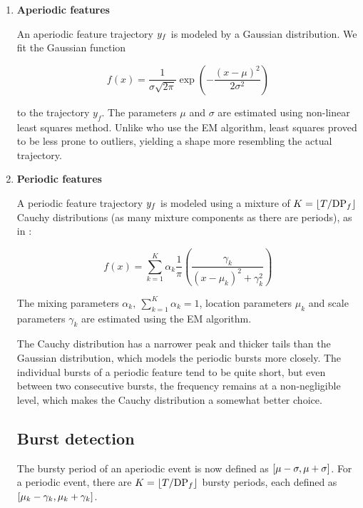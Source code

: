 \begin{enumerate}

\item \textbf{Aperiodic features}

An aperiodic feature trajectory $y_{f}$ is modeled by a Gaussian distribution. We fit the Gaussian function

\begin{equation*}
	f(x) = \frac{1}{\sigma \sqrt{2 \pi}} \exp(-\frac{\left( x - \mu \right)^{2}}{2 \sigma^{2}})
\end{equation*}

to the trajectory $y_{f}$. The parameters $\mu$ and $\sigma$ are estimated using non-linear least squares method. Unlike \cite{event-detection} who use the EM algorithm, least squares proved to be less prone to outliers, yielding a shape more resembling the actual trajectory.

\item \textbf{Periodic features}

A periodic feature trajectory $y_{f}$ is modeled using a mixture of $K = \lfloor T / \text{DP}_{f}\rfloor$ Cauchy distributions (as many mixture components as there are periods), as in \cite{health-events}:

\begin{equation*}
	f(x) = \sum_{k = 1}^{K}{\alpha_{k} \frac{1}{\pi} \left( \frac{\gamma_{k}}{\left( x - \mu_{k} \right)^{2} + \gamma_{k}^{2}} \right)}
\end{equation*}

The mixing parameters $\alpha_{k},\ \sum_{k = 1}^{K}{\alpha_{k}} = 1$, location parameters $\mu_{k}$ and scale parameters $\gamma_{k}$ are estimated using the EM algorithm.

The Cauchy distribution has a narrower peak and thicker tails than the Gaussian distribution, which models the periodic bursts more closely. The individual bursts of a periodic feature tend to be quite short, but even between two consecutive bursts, the frequency remains at a non-negligible level, which makes the Cauchy distribution a somewhat better choice.


\subsection{Burst detection}
The bursty period of an aperiodic event is now defined as $\interval{\mu - \sigma}{\mu + \sigma}$. For a periodic event, there are $K = \lfloor T / \text{DP}_{f}\rfloor$ bursty periods, each defined as $\interval{\mu_{k} - \gamma_{k}}{\mu_{k} + \gamma_{k}}$.




\end{enumerate}
